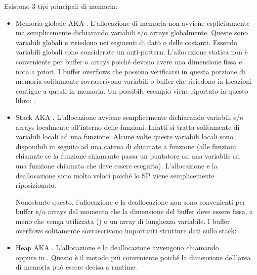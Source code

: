 ﻿

Esistono 3 tipi principali di memoria:

\begin{itemize}
\item
Memoria globale \ac{AKA} .
L'allocazione di memoria non avviene esplicitamente ma semplicemente dichiarando variabili e/o arrays globalmente.
Queste sono variabili globali e risiedono nei segmenti di dato o delle costanti. Essendo variabili globali sono considerate un \gls{anti-pattern}.
L'allocazione statica non è conveniente per buffer o arrays poiché devono avere una dimensione fissa e nota a priori.
I buffer overflows che possono verificarsi in questa porzione di memoria solitamente sovrascrivono variabili o buffer che risiedono in locazioni contigue a questi in memoria.
Un possibile esempio viene riportato in questo libro: .


\item
Stack \ac{AKA} .
L'allocazione avviene semplicemente dichiarando variabili e/o arrays localmente all'interno delle funzioni. Infatti si tratta solitamente di variabili locali ad una funzione.
Alcune volte queste variabili locali sono disponibili in seguito ad una catena di chiamate a funzione (alle funzioni \gls{chiamate} se la funzione chiamante passa un puntatore ad una variabile ad una funzione \gls{chiamata} che deve essere eseguita).
L'allocazione e la deallocazione sono molto veloci poiché lo \ac{SP} viene semplicemente riposizionato.


Nonostante questo, l'allocazione e la deallocazione non sono convenienti per buffer e/o arrays dal momento che la dimensione del buffer deve essere fissa, a meno che venga utilizzata  () o un array di lunghezza variabile.
I buffer overflows solitamente sovrascrivono importanti strutture dati sullo stack: .

\item
Heap \ac{AKA} .
L'allocazione e la deallocazione avvengono chiamando \\
 oppure  in \Cpp.
Questo è il metodo più conveniente poiché la dimensione dell'area di memoria può essere decisa a runtime.


\end{itemize}
